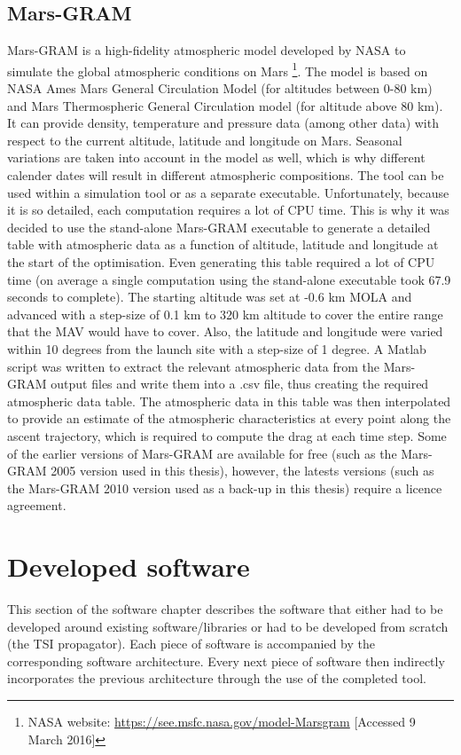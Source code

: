 \subsection{Mars-\ac{GRAM}}
\label{subsec:marsgram}
Mars-\ac{GRAM} is a high-fidelity atmospheric model developed by NASA to simulate the global atmospheric conditions on Mars \citep{justus2008utilizing} \footnote{NASA website: \url{https://see.msfc.nasa.gov/model-Marsgram} [Accessed 9 March 2016]}. The model
is based on NASA Ames Mars General Circulation Model (for altitudes between 0-80 km) and Mars Thermospheric General Circulation model (for altitude above 80 km). It can provide density, temperature and pressure data (among other data) with respect to the current altitude, latitude and longitude on Mars.  Seasonal variations are taken into account in the model as well, which is why different calender dates will result in different atmospheric compositions. The tool can be used within a simulation tool or as a separate executable. Unfortunately, because it is so detailed, each computation requires a lot of CPU time. This is why it was decided to use the stand-alone Mars-\ac{GRAM} executable to generate a detailed table with atmospheric data as a function of altitude, latitude and longitude at the start of the optimisation. Even generating this table required a lot of CPU time (on average a single computation using the stand-alone executable took 67.9 seconds to complete). The starting altitude was set at -0.6 km \ac{MOLA} and advanced with a step-size of 0.1 km to 320 km altitude to cover the entire range that the \ac{MAV} would have to cover. Also, the latitude and longitude were varied within 10 degrees from the launch site with a step-size of 1 degree. A Matlab script was written to extract the relevant atmospheric data from the Mars-\ac{GRAM} output files and write them into a .csv file, thus creating the required atmospheric data table. The atmospheric data in this table was then interpolated to provide an estimate of the atmospheric characteristics at every point along the ascent trajectory, which is required to compute the drag at each time step. Some of the earlier versions of Mars-\ac{GRAM} are available for free (such as the Mars-\ac{GRAM} 2005 version used in this thesis), however, the latests versions (such as the Mars-\ac{GRAM} 2010 version used as a back-up in this thesis) require a licence agreement.


\section{Developed software}
\label{sec:developedsoftware}
This section of the software chapter describes the software that either had to be developed around existing software/libraries or had to be developed from scratch (the \ac{TSI} propagator). Each piece of software is accompanied by the corresponding software architecture. Every next piece of software then indirectly incorporates the previous architecture through the use of the completed tool.


